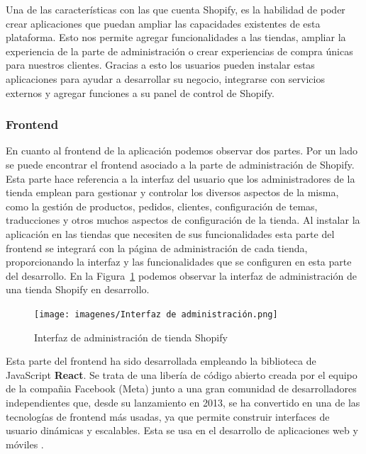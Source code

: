 \documentclass[12pt]{article}
\begin{document}
Una de las características con las que cuenta Shopify, es la habilidad de poder crear aplicaciones que puedan ampliar las capacidades existentes 
de esta plataforma. Esto nos permite agregar funcionalidades a las tiendas, ampliar la experiencia de la parte de administración
o crear experiencias de compra únicas para nuestros clientes. Gracias a esto los usuarios pueden instalar estas aplicaciones para ayudar a desarrollar
su negocio, integrarse con servicios externos y agregar funciones a su panel de control de Shopify. \cite{shopify-dev}

\subsubsection{Frontend}
En cuanto al frontend de la aplicación podemos observar dos partes. 
Por un lado se puede encontrar el frontend asociado a la parte de administración de Shopify. 
Esta parte hace referencia a la interfaz del usuario que los administradores de la tienda emplean para gestionar y controlar los diversos aspectos de
la misma, como la gestión de productos, pedidos, clientes, configuración de temas, traducciones y otros muchos aspectos de configuración de la tienda.
Al instalar la aplicación en las tiendas que necesiten de sus funcionalidades esta parte del frontend se integrará con la página de administración de 
cada tienda, proporcionando la interfaz y las funcionalidades que se configuren en esta parte del desarrollo. En la Figura~\ref{fig:1} podemos observar la 
interfaz de administración de una tienda Shopify en desarrollo.

\begin{figure}[ht]
    \centering
    \texttt{[image: imagenes/Interfaz de administración.png]}
    \caption{\label{fig:1}Interfaz de administración de tienda Shopify}
    \vspace{\fill}
\end{figure}

Esta parte del frontend ha sido desarrollada empleando la biblioteca de JavaScript \textbf{React}. Se trata de una libería de código abierto creada por el equipo de la
compañia Facebook (Meta) junto a una gran comunidad de desarrolladores independientes que, desde su lanzamiento en 2013, se ha convertido en una
de las tecnologías de frontend más usadas, ya que permite construir interfaces de usuario dinámicas y escalables. Esta se usa en el desarrollo de aplicaciones web y móviles \cite{react-pag-1}. 
\end{document}
